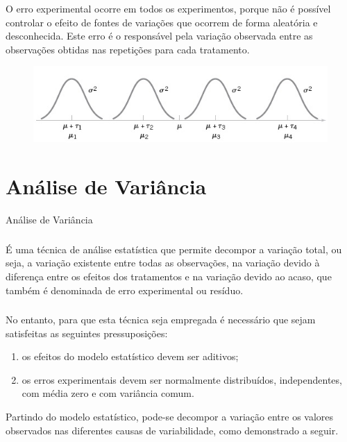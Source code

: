\documentclass[14pt,aspectratio=1610]{beamer}
\begin{document}
\begin{frame}{}
\frametitle{}
\begin{block}{}
\justifying
O erro experimental ocorre em todos os experimentos, porque não é possível controlar o efeito de fontes de variações que ocorrem de forma aleatória e desconhecida. Este erro é o responsável pela variação observada entre as observações obtidas nas repetições para cada tratamento.

\begin{figure}[H]
    \centering
    \includegraphics[scale=0.5]{Figuras/fig2}
  \end{figure}

\end{block}
\end{frame}

\section{Análise de Variância}
\begin{frame}{Análise de Variância}
\frametitle{}
\begin{block}{}
\justifying
É uma técnica de análise estatística que permite decompor a variação total, ou
seja, a variação existente entre todas as observações, na variação devido à diferença
entre os efeitos dos tratamentos e na variação devido ao acaso, que também é
denominada de erro experimental ou resíduo.
\end{block}
\end{frame}

\begin{frame}{}
\frametitle{}
\begin{block}{}
\justifying
No entanto, para que esta técnica seja empregada é necessário que sejam
satisfeitas as seguintes pressuposições:
\begin{enumerate}
\item os efeitos do modelo estatístico devem ser aditivos;\pause
\item os erros experimentais devem ser normalmente distribuídos, independentes, com
média zero e com variância comum.
\end{enumerate}
Partindo do modelo estatístico, pode-se decompor a variação entre os valores
observados nas diferentes causas de variabilidade, como demonstrado a seguir.
\end{block}
\end{frame}
\end{document}
